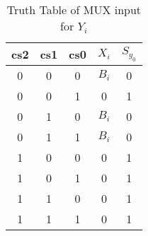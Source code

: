 \documentclass{article}
\begin{document}
\begin{table}[H]
    
    \centering
    \begin{tabular}{|c|c|c|c|c|}
    \hline
         cs2 & cs1 & cs0 & $X_{i}$ & $S_{y_0}$  \\
         \hline
         0 & 0 & 0 & $B_{i}$ & 0 \\
         0 & 0 & 1 & 0 & 1 \\
         0 & 1 & 0 & $B_{i}$ & 0  \\
         0 & 1 & 1 & $B_{i}$ & 0  \\
         1 & 0 & 0 & 0 & 1\\
         1 & 0 & 1 & 0 & 1\\
         1 & 1 & 0 & 0 & 1\\
         1 & 1 & 1 & 0 & 1\\
         \hline
    \end{tabular}
    \caption{Truth Table of MUX input for $Y_i$}
    \label{tab:truth_table3}
\end{table}
\end{document}
